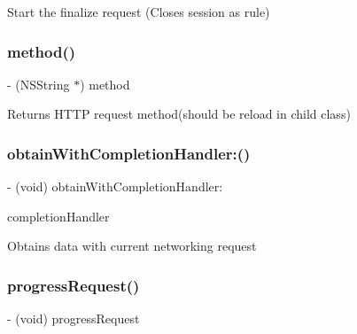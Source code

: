 Start the finalize request (Closes session as rule) \hypertarget{interface_s_t_c_networking_manager_af79912da518a87b9999b0f72bfebb32c}{}\label{interface_s_t_c_networking_manager_af79912da518a87b9999b0f72bfebb32c} 
\subsubsection{\texorpdfstring{method()}{method()}}
{\footnotesize\ttfamily -\/ (N\+S\+String $\ast$) method \begin{DoxyParamCaption}{ }\end{DoxyParamCaption}}

Returns H\+T\+TP request method(should be reload in child class) \hypertarget{interface_s_t_c_networking_manager_aa440c5c6bc3dd49061dfaf9c250a6c66}{}\label{interface_s_t_c_networking_manager_aa440c5c6bc3dd49061dfaf9c250a6c66} 
\subsubsection{\texorpdfstring{obtain\+With\+Completion\+Handler\+:()}{obtainWithCompletionHandler:()}}
{\footnotesize\ttfamily -\/ (void) obtain\+With\+Completion\+Handler\+: \begin{DoxyParamCaption}\item[{(Completion\+Handler)}]{completion\+Handler }\end{DoxyParamCaption}}

Obtains data with current networking request \hypertarget{interface_s_t_c_networking_manager_a0d41396419e85cc70d42ac278510d41f}{}\label{interface_s_t_c_networking_manager_a0d41396419e85cc70d42ac278510d41f} 
\subsubsection{\texorpdfstring{progress\+Request()}{progressRequest()}}
{\footnotesize\ttfamily -\/ (void) progress\+Request \begin{DoxyParamCaption}{ }\end{DoxyParamCaption}}


